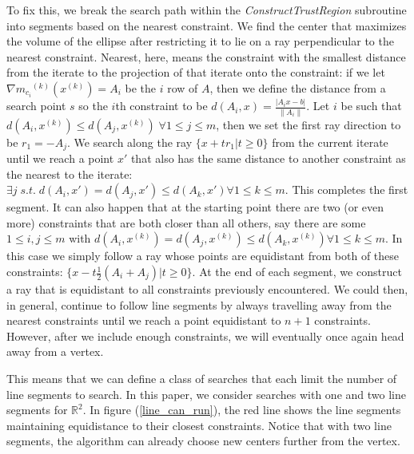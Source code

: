 \documentclass{article}
\theoremstyle{case}
\newcommand{\modelconstrainti}{{{m}_{c_i}}^{(k)}}
\newcommand{\iteratek}{{x}^{(k)}}
\let\oldref\ref
\renewcommand{\ref}[1]{(\oldref{#1})}
\begin{document}
To fix this, we break the search path within the \emph{ConstructTrustRegion} subroutine into segments based on the nearest constraint.
We find the center that maximizes the volume of the ellipse after restricting it to lie on a ray perpendicular to the nearest constraint.
Nearest, here, means the constraint with the smallest distance from the iterate to the projection of that iterate onto the constraint:
if we let $\nabla \modelconstrainti(\iteratek) = A_i$ be the $i$ row of $A$, then we define the distance from a search point $s$ so the $i$th constraint to be
$d(A_i, x) = \frac {|A_i x - b|}{\|A_i\|}$.
Let $i$ be such that $d(A_i, \iteratek) \le d(A_j, \iteratek) \; \forall 1\le j\le m$, then we set the first ray direction to be $r_1=-A_j$.
We search along the ray $\{x +tr_1|t\ge 0\}$ from the current iterate until we reach a point $x'$ that also has the same distance to another constraint as the nearest to the iterate:
$\exists j \;s.t.\; d(A_i, x') = d(A_j, x') \le d(A_k, x') \forall 1\le k \le m$.
This completes the first segment.
It can also happen that at the starting point there are two (or even more) constraints that are both closer than all others, say there are some $1\le i,j\le m$ with $d(A_i, \iteratek) = d(A_j, \iteratek) \le d(A_k, \iteratek)  \forall 1\le k \le m$.
In this case we simply follow a ray whose points are equidistant from both of these constraints: $\{x - t\frac 1 2 (A_i + A_j)| t \ge 0\}$.
At the end of each segment, we construct a ray that is equidistant to all constraints previously encountered.
We could then, in general, continue to follow line segments by always travelling away from the nearest constraints until we reach a point equidistant to $n+1$ constraints.
However, after we include enough constraints, we will eventually once again head away from a vertex.

This means that we can define a class of searches that each limit the number of line segments to search.
In this paper, we consider searches with one and two line segments for $\mathbb R^2$.
In figure \ref{line_can_run}, the red line shows the line segments maintaining equidistance to their closest constraints.
Notice that with two line segments, the algorithm can already choose new centers further from the vertex.
\end{document}
